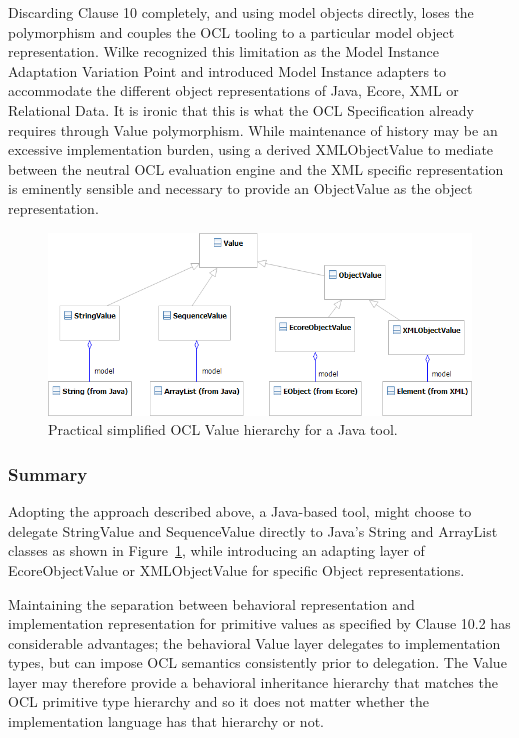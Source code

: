 \documentclass{eceasst}
\begin{document}
Discarding Clause 10 completely, and using model objects directly, loses the polymorphism and couples the OCL tooling to a particular model object representation. Wilke\cite{Variability} recognized this limitation as the Model Instance Adaptation Variation Point and introduced Model Instance adapters to accommodate the different object representations of Java, Ecore, XML or Relational Data. It is ironic that this is what the OCL Specification already requires through Value polymorphism. While maintenance of history may be an excessive implementation burden, using a derived XMLObjectValue to mediate between the neutral OCL evaluation engine and the XML specific representation is eminently sensible and necessary to provide an ObjectValue as the object representation.

\begin{figure}
  \begin{center}
    \includegraphics[width=5.75in]{Value.png}
  \end{center}
  \caption{Practical simplified OCL Value hierarchy for a Java tool.}
  \label{fig:Value}
\end{figure}

\subsubsection{Summary}

Adopting the approach described above, a Java-based tool, might choose to delegate StringValue and SequenceValue directly to Java's String and ArrayList classes as shown in Figure~\ref{fig:Value}, while introducing an adapting layer of EcoreObjectValue or XMLObjectValue for specific Object representations.

Maintaining the separation between behavioral representation and implementation representation for primitive values as specified by Clause 10.2 has considerable advantages; the behavioral Value layer delegates to implementation types, but can impose OCL semantics consistently prior to delegation. The Value layer may therefore provide a behavioral inheritance hierarchy that matches the OCL primitive type hierarchy and so it does not matter whether the implementation language has that hierarchy or not.
\end{document}
